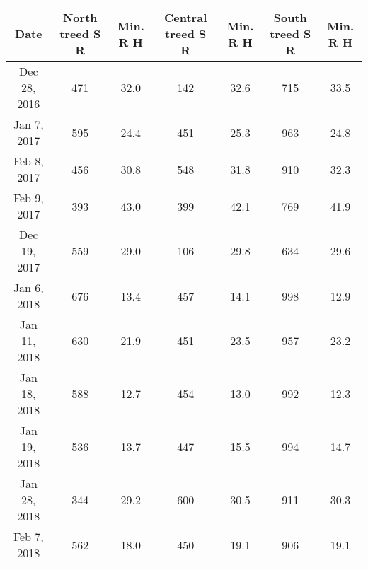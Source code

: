 \documentclass[twocolumn, a4paper]{article}
\begin{document}
      \begin{table}
	\begin{tabular}{|c||c|c||c|c||c|c|}
	\hline 
	 Date & North treed S R & Min. R H & Central treed S R & Min. R H & South treed S R & Min. R H \\ 
	\hline 
	Dec 28, 2016 & 471 & 32.0 & 142 & 32.6 & 715 & 33.5 \\ 
	\hline 
	Jan 7, 2017 & 595 & 24.4 & 451 & 25.3 & 963 & 24.8 \\ 
	\hline 
	Feb 8, 2017 & 456 & 30.8 & 548 & 31.8 & 910 & 32.3 \\ 
	\hline 
	Feb 9, 2017 & 393 & 43.0 & 399 & 42.1 & 769 & 41.9 \\ 
	\hline 
	Dec 19, 2017 & 559 & 29.0 & 106 & 29.8 & 634 & 29.6 \\ 
	\hline 
	Jan 6, 2018 & 676 & 13.4 & 457 & 14.1 & 998 & 12.9 \\ 
	\hline 
	Jan 11, 2018 & 630 & 21.9 & 451 & 23.5 & 957 & 23.2 \\ 
	\hline 
	Jan 18, 2018 & 588 & 12.7 & 454 & 13.0 & 992 & 12.3 \\ 
	\hline 
	Jan 19, 2018 & 536 & 13.7 & 447 & 15.5 & 994 & 14.7 \\ 
	\hline 
	Jan 28, 2018 & 344 & 29.2 & 600 & 30.5 & 911 & 30.3 \\ 
	\hline 
	Feb 7, 2018 & 562 & 18.0 & 450 & 19.1 & 906 & 19.1 \\ 
	\hline 
\end{tabular} 
      \end{table}
\end{document}
